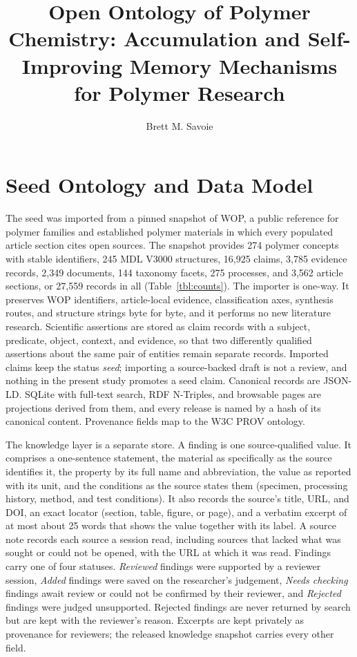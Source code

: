 \documentclass[journal=mamobx,manuscript=suppinfo]{achemso}
\author{Brett M. Savoie}
\affiliation[University of Notre Dame]
{Department of Chemical and Biomolecular Engineering, University of Notre Dame, Notre Dame, Indiana 46556, United States}
\title{Open Ontology of Polymer Chemistry: Accumulation and Self-Improving Memory Mechanisms for Polymer Research}
\begin{document}
\maketitle

\tableofcontents

\section{Seed Ontology and Data Model}
\label{si:seed}

The seed was imported from a pinned snapshot of WOP, a public reference for polymer families and established polymer materials in which every populated article section cites open sources.\cite{WOP2026Wiki}
The snapshot provides 274 polymer concepts with stable identifiers, 245 MDL V3000 structures, 16,925 claims, 3,785 evidence records, 2,349 documents, 144 taxonomy facets, 275 processes, and 3,562 article sections, or 27,559 records in all (Table~\ref{tbl:counts}).
The importer is one-way.
It preserves WOP identifiers, article-local evidence, classification axes, synthesis routes, and structure strings byte for byte, and it performs no new literature research.
Scientific assertions are stored as claim records with a subject, predicate, object, context, and evidence, so that two differently qualified assertions about the same pair of entities remain separate records.
Imported claims keep the status \emph{seed}; importing a source-backed draft is not a review, and nothing in the present study promotes a seed claim.
Canonical records are JSON-LD.
SQLite with full-text search, RDF N-Triples, and browsable pages are projections derived from them, and every release is named by a hash of its canonical content.
Provenance fields map to the W3C PROV ontology.\cite{Lebo2013PROVO}

The knowledge layer is a separate store.
A finding is one source-qualified value.
It comprises a one-sentence statement, the material as specifically as the source identifies it, the property by its full name and abbreviation, the value as reported with its unit, and the conditions as the source states them (specimen, processing history, method, and test conditions).
It also records the source's title, URL, and DOI, an exact locator (section, table, figure, or page), and a verbatim excerpt of at most about 25 words that shows the value together with its label.
A source note records each source a session read, including sources that lacked what was sought or could not be opened, with the URL at which it was read.
Findings carry one of four statuses.
\emph{Reviewed} findings were supported by a reviewer session, \emph{Added} findings were saved on the researcher's judgement, \emph{Needs checking} findings await review or could not be confirmed by their reviewer, and \emph{Rejected} findings were judged unsupported.
Rejected findings are never returned by search but are kept with the reviewer's reason.
Excerpts are kept privately as provenance for reviewers; the released knowledge snapshot carries every other field.
\end{document}
